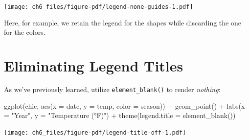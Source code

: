 \documentclass[
  letterpaper,
]{scrbook}
\newenvironment{Shaded}{\begin{snugshade}}{\end{snugshade}}
\newcommand{\AttributeTok}[1]{\textcolor[rgb]{0.40,0.45,0.13}{#1}}
\newcommand{\FunctionTok}[1]{\textcolor[rgb]{0.28,0.35,0.67}{#1}}
\newcommand{\NormalTok}[1]{\textcolor[rgb]{0.00,0.23,0.31}{#1}}
\newcommand{\SpecialCharTok}[1]{\textcolor[rgb]{0.37,0.37,0.37}{#1}}
\newcommand{\StringTok}[1]{\textcolor[rgb]{0.13,0.47,0.30}{#1}}
\begin{document}
\texttt{[image: ch6\_files/figure-pdf/legend-none-guides-1.pdf]}

Here, for example, we retain the legend for the shapes while discarding
the one for the colors.

\section{Eliminating Legend Titles}\label{eliminating-legend-titles}

As we've previously learned, utilize \texttt{element\_blank()} to render
\emph{nothing}:

\begin{Shaded}
\begin{Highlighting}[]
\FunctionTok{ggplot}\NormalTok{(chic, }\FunctionTok{aes}\NormalTok{(}\AttributeTok{x =}\NormalTok{ date, }\AttributeTok{y =}\NormalTok{ temp, }\AttributeTok{color =}\NormalTok{ season)) }\SpecialCharTok{+}
  \FunctionTok{geom\_point}\NormalTok{() }\SpecialCharTok{+}
  \FunctionTok{labs}\NormalTok{(}\AttributeTok{x =} \StringTok{"Year"}\NormalTok{, }\AttributeTok{y =} \StringTok{"Temperature (°F)"}\NormalTok{) }\SpecialCharTok{+}
  \FunctionTok{theme}\NormalTok{(}\AttributeTok{legend.title =} \FunctionTok{element\_blank}\NormalTok{())}
\end{Highlighting}
\end{Shaded}

\texttt{[image: ch6\_files/figure-pdf/legend-title-off-1.pdf]}
\end{document}
